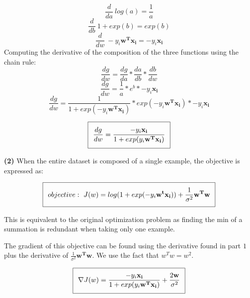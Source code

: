 \documentclass[11pt]{article}
\renewcommand\part[1]{\vspace{.10in}\textbf{(#1)}}
\begin{document}
$$\frac{d}{da} \ log(a) = \frac{1}{a}$$
$$\frac{d}{db} \ 1 + exp(b)= exp(b)$$
$$\frac{d}{dw} \ -y_i\mathbf{w^Tx_i} = -y_i\mathbf{x_i}$$
Computing the derivative of the composition of the three functions using the chain rule:
$$\frac{dg}{dw} = \frac{dg}{da} * \frac{da}{db} * \frac{db}{dw}$$
$$\frac{dg}{dw} = \frac{1}{a} * e^b * -y_i\mathbf{x_i}$$
$$\frac{dg}{dw} = \frac{1}{1 + exp(-y_i\mathbf{w^Tx_i})} * exp(-y_i\mathbf{w^Tx_i}) * -y_i\mathbf{x_i}$$

\begin{equation}
\setlength\fboxsep{0.25cm}
\setlength\fboxrule{0.4pt}
\boxed{\frac{dg}{dw} = \frac{-y_i\mathbf{x_i}}{1 + exp(y_i\mathbf{w^Tx_i})}}
\end{equation} 

\part{2} When the entire dataset is composed of a single example, the objective is expressed as:

\begin{equation}
\setlength\fboxsep{0.25cm}
\setlength\fboxrule{0.4pt}
\boxed{objective:\ J(w) = log(1 + exp(-y_i\mathbf{w^tx_i})) + \frac{1}{\sigma^2}\mathbf{w^Tw}}
\end{equation}

This is equivalent to the original optimization problem as finding the min of a summation is redundant when taking only one example.

The gradient of this objective can be found using the derivative found in part $1$ plus the derivative of $\frac{1}{\sigma^2}\mathbf{w^Tw}$. We use the fact that $w^Tw = w^2$.

\begin{equation}
\setlength\fboxsep{0.25cm}
\setlength\fboxrule{0.4pt}
\boxed{\nabla J(w) = \frac{-y_i\mathbf{x_i}}{1 + exp(y_i\mathbf{w^Tx_i})} + \frac{2\mathbf{w}}{\sigma^2}}
\end{equation}
\end{document}
